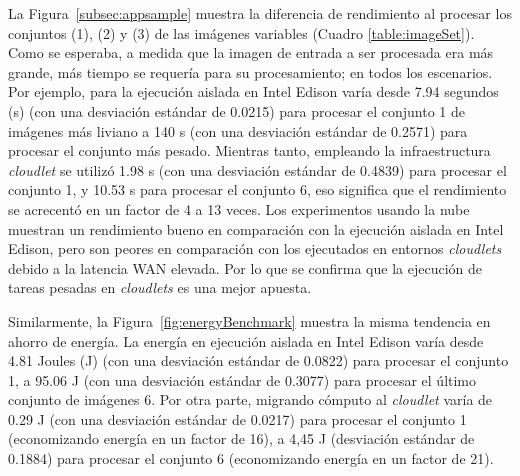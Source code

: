 La Figura~\ref{subsec:appsample} muestra la diferencia de rendimiento al procesar los conjuntos (1), (2) y (3) de las
imágenes variables (Cuadro \ref{table:imageSet}). Como se esperaba, a medida que la imagen de entrada a ser procesada era más grande, más tiempo
se requería para su procesamiento; en todos los escenarios. Por ejemplo, para la ejecución aislada en Intel Edison varía desde 7.94 segundos (s)
(con una desviación estándar de  0.0215) para procesar el conjunto 1 de imágenes más liviano a 140 s (con una desviación estándar de 0.2571)
para procesar el conjunto más pesado. Mientras tanto, empleando la infraestructura \textit{cloudlet} se utilizó 1.98 s (con una desviación estándar de
0.4839) para procesar el conjunto 1, y 10.53 s para procesar el conjunto 6, eso significa que el rendimiento se acrecentó en un factor de
4 a 13 veces. Los experimentos usando la nube muestran un rendimiento bueno en comparación con la ejecución aislada en Intel Edison, pero son peores
en comparación con los ejecutados en entornos \textit{cloudlets} debido a la latencia WAN elevada. Por lo que se confirma que la ejecución de 
tareas pesadas en \textit{cloudlets} es una mejor apuesta.

Similarmente, la Figura~\ref{fig:energyBenchmark} muestra la misma tendencia en ahorro de energía. La energía en ejecución aislada en 
Intel Edison varía desde 4.81 Joules (J) (con una desviación estándar de 0.0822) para procesar el conjunto 1, a 95.06 J
(con una desviación estándar de 0.3077) para procesar el último conjunto de imágenes 6. Por otra parte, migrando cómputo al \textit{cloudlet}
varía de  0.29 J (con una desviación estándar de 0.0217) para procesar el conjunto 1 (economizando energía en un factor de 16), a 4,45 J (desviación
estándar de 0.1884) para procesar el conjunto 6 (economizando energía en un factor de 21).

